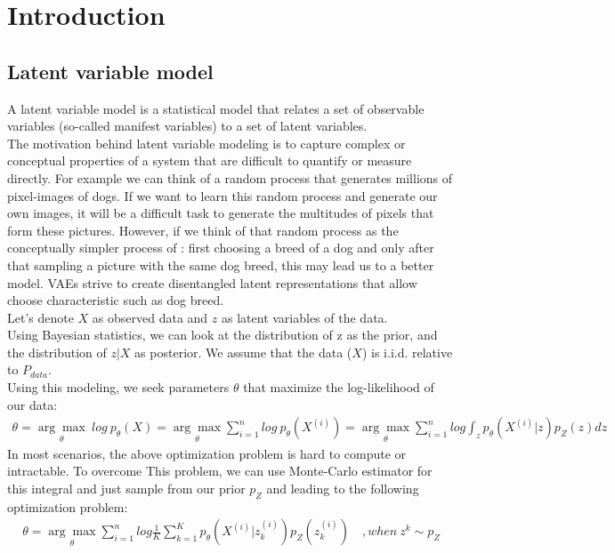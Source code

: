 \chapter*{Introduction}
\section*{Latent variable model}
A latent variable model is a statistical model that relates a set of observable variables (so-called manifest variables) to a set of latent variables.
\\ The motivation behind latent variable modeling is to capture complex or conceptual properties of a system that are difficult to quantify or measure directly. For example we can think of a random process that generates millions of pixel-images of dogs. If we want to learn this random process and generate our own images, it will be a difficult task to generate the multitudes of pixels that form these pictures. However, if we think of that random process as the conceptually simpler process of : first choosing a breed of a dog and only after that sampling a picture with the same dog breed, this may lead us to a better model. VAEs strive to create disentangled latent representations that allow choose characteristic such as dog breed. \\ 
Let's denote $X$ as observed data and $z$ as latent variables of the data. \\ Using Bayesian statistics,  we can look at the distribution of z as the prior, and the distribution of $z|X$ as posterior. We assume that the data ($X$) is i.i.d. relative to $P_{data}$. \\ 
Using this modeling, we seek parameters $\theta$ that maximize the log-likelihood of our data:
\begin{gather*}
\theta = \underset{\theta}{\arg\max} \ log \ p_{\theta}(X)=\underset{\theta}{\arg\max} \sum_{i=1}^{n} log \ p_{\theta}(X^{(i)})=\underset{\theta}{\arg\max} \sum_{i=1}^{n}log \int_z p_{\theta}(X^{(i)}|z)p_{Z}(z)dz
\end{gather*}
In most scenarios, the above optimization problem is hard to compute or intractable. To overcome This problem, we can use Monte-Carlo estimator for this integral and just sample from our prior $p_{Z}$ and leading to the following optimization problem: 
\begin{gather*}
\theta = \underset{\theta}{\arg\max} \sum_{i=1}^{n}log \frac{1}{K} \sum_{k=1}^{K} p_{\theta}(X^{(i)}|z_{k}^{(i)})p_{Z}(z_{k}^{(i)}) \quad , when \ z^{k}\sim p_{Z}
\end{gather*}
